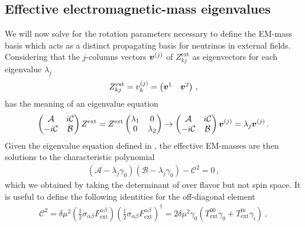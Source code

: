 \subsection{Effective electromagnetic-mass eigenvalues}
\label{sec:emmass}
We will now solve for the rotation parameters necessary to define the EM-mass basis which acts as a distinct propagating basis for neutrinos in external fields. Considering that the $j$-columns vectors $\boldsymbol{v}^{(j)}$ of $Z_{kj}^\mathrm{ext}$ as eigenvectors for each eigenvalue $\lambda_{j}$
\begin{align}
    \label{herm:5}
    Z_{kj}^\mathrm{ext}=v_{k}^{(j)}=
    \begin{pmatrix}
        \boldsymbol{v}^{1} & \boldsymbol{v}^{2}
    \end{pmatrix}\,,
\end{align}
 has the meaning of an eigenvalue equation
\begin{align}
    \label{herm:6}
    \begin{pmatrix}
        \mathcal{A} & i\mathcal{C}\\
        -i\mathcal{C} & \mathcal{B}
    \end{pmatrix}Z^\mathrm{ext}=
    Z^\mathrm{ext}\begin{pmatrix}
        \lambda_{1} & 0\\
        0 & \lambda_{2}
    \end{pmatrix}\rightarrow
    \begin{pmatrix}
        \mathcal{A} & i\mathcal{C}\\
        -i\mathcal{C} & \mathcal{B}
    \end{pmatrix}\boldsymbol{v}^{(j)}=\lambda_{j}\boldsymbol{v}^{(j)}\,.
\end{align}
Given the eigenvalue equation defined in , the effective EM-masses are then solutions to the characteristic polynomial
\begin{align}
\label{poly:1}
(\mathcal{A}-\lambda_{j}\gamma_{0})(\mathcal{B}-\lambda_{j}\gamma_{0})-\mathcal{C}^{2}=0\,,
\end{align}
which we obtained by taking the determinant of  over flavor but not spin space. It is useful to define the following identities for the off-diagonal element
\begin{align}
\label{poly:1a}
\mathcal{C}^{2} = 
\delta\mu^{2}\left(\frac{1}{2}\sigma_{\alpha\beta}F^{\alpha\beta}_\mathrm{ext}\right)\left(\frac{1}{2}\sigma_{\alpha\beta}F^{\alpha\beta}_\mathrm{ext}\right)^{\dag}=
2\delta\mu^{2}\gamma_{0}\left(T_\mathrm{ext}^{00}\gamma_{0}+T_\mathrm{ext}^{0i}\gamma_{i}\right)\,,
\end{align}
